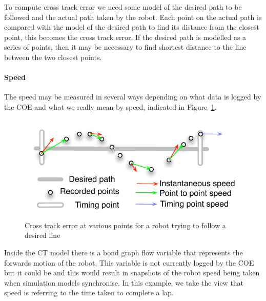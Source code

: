 To compute cross track error we need some model of the desired path to be followed and the actual path taken by the robot.  Each point on the actual path is compared with the model of the desired path to find its distance from the closest point, this becomes the cross track error.  If the desired path is modelled as a series of points, then it may be necessary to find shortest distance to the line between the two closest points.





\paragraph{Speed}
The speed may be measured in several ways depending on what data is logged by the COE and what we really mean by speed, indicated in Figure~\ref{fig:robotSpeed}.

\begin{figure}[htbp]
	\centering
	\includegraphics[scale=0.8]{figures/robotSpeed}
\caption{Cross track error at various points for a robot trying to follow a desired line}\label{fig:robotSpeed}
\end{figure}

Inside the CT model there is a bond graph flow variable that represents the forwards motion of the robot.  This variable is not currently logged by the COE but it could be and this would result in snapshots of the robot speed being taken when simulation models synchronise.  In this example, we take the view that speed is referring to the time taken to complete a lap.


